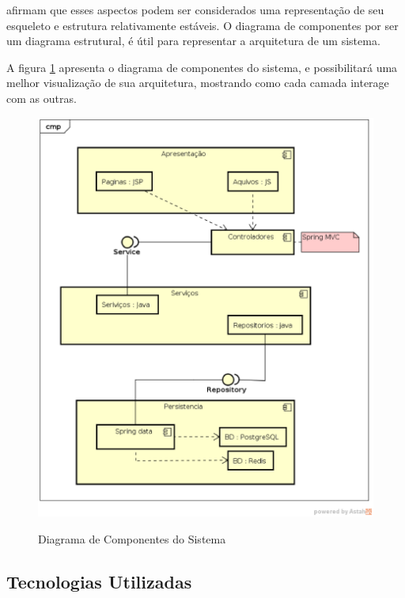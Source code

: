 \documentclass[a4paper,12pt]{monografia}
\begin{document}
 afirmam que esses aspectos podem ser considerados uma representação de seu esqueleto e estrutura relativamente estáveis. O diagrama de componentes por ser um diagrama estrutural, é útil para representar a arquitetura de um sistema.

A figura \ref{fig:cd} apresenta o diagrama de componentes do sistema, e possibilitará uma melhor visualização de sua arquitetura, mostrando como cada camada interage com as outras.

\begin{figure}[H]
\centering
\caption{Diagrama de Componentes do Sistema}
\centering
\includegraphics[width=15cm]{img/diagramas/cd.eps}\\
\label{fig:cd}
\end{figure}


\subsection{Tecnologias Utilizadas} %
\label{sub:tecnologias_ultilizadas}
\end{document}

